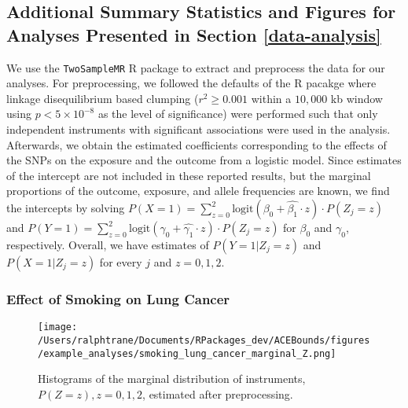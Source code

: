 \documentclass[
]{article}
\theoremstyle{plain}
\begin{document}
\hypertarget{additional-summary-statistics-and-figures-for-analyses-presented-in-section}{%
\subsection{\texorpdfstring{Additional Summary Statistics and Figures for Analyses Presented in Section \ref{data-analysis} \label{more-details-data-application-appendix}}{Additional Summary Statistics and Figures for Analyses Presented in Section  }}\label{additional-summary-statistics-and-figures-for-analyses-presented-in-section}}

We use the \texttt{TwoSampleMR} R package \autocite{mrbase} to extract and preprocess the data for our analyses. For preprocessing, we followed the defaults of the R pacakge where linkage disequilibrium based clumping (\(r^2 \ge 0.001\) within a \(10,000\) kb window using \(p < 5 \times 10^{-8}\) as the level of significance) were performed such that only independent instruments with significant associations were used in the analysis. Afterwards, we obtain the estimated coefficients corresponding to the effects of the SNPs on the exposure and the outcome from a logistic model. Since estimates of the intercept are not included in these reported results, but the marginal proportions of the outcome, exposure, and allele frequencies are known, we find the intercepts by solving \(P(X = 1) = \sum_{z = 0}^2\text{logit}(\beta_0 + \hat{\beta_1}\cdot z)\cdot P(Z_j = z)\) and \(P(Y = 1) = \sum_{z = 0}^2\text{logit}(\gamma_0 + \hat{\gamma_1}\cdot z)\cdot P(Z_j = z)\) for \(\beta_0\) and \(\gamma_0\), respectively. Overall, we have estimates of \(P(Y = 1 | Z_j = z)\) and \(P(X = 1 | Z_j = z)\) for every \(j\) and \(z=0,1,2\).

\hypertarget{effect-of-smoking-on-lung-cancer}{%
\subsubsection{\texorpdfstring{Effect of Smoking on Lung Cancer \label{appendix:smoking-on-lung-cancer}}{Effect of Smoking on Lung Cancer }}\label{effect-of-smoking-on-lung-cancer}}

\begin{figure}[H]
  \center
  \texttt{[image: /Users/ralphtrane/Documents/RPackages\_dev/ACEBounds/figures/example\_analyses/smoking\_lung\_cancer\_marginal\_Z.png]}
  \caption{Histograms of the marginal distribution of instruments, $P(Z = z), z=0,1,2$, estimated after preprocessing.}
  \label{fig:marginal-distribution-of-instruments-lung-cancer}
\end{figure}
\end{document}
